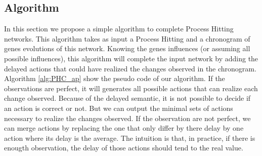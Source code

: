 \subsection{Algorithm}
In this section we propose a simple algorithm to complete Process Hitting networks.
This algorithm takes as input a Process Hitting and a chronogram of genes evolutions of this network.
Knowing the genes influences (or assuming all possible influences),
this algorithm will complete the input network by adding the delayed actions that could have realized the changes observed in the chronogram.
Algorithm \ref{alg:PHC_ap} show the pseudo code of our algorithm.
If the observations are perfect, it will generates all possible actions that can realize each change observed.
Because of the delayed semantic, it is not possible to decide if an action is correct or not.
But we can output the minimal sets of actions necessary to realize the changes observed.
If the observation are not perfect, we can merge actions by replacing the one that only differ by there delay by one action where its delay is the average.
The intuition is that, in practice, if there is enougth observation, the delay of those actions should tend to the real value.

